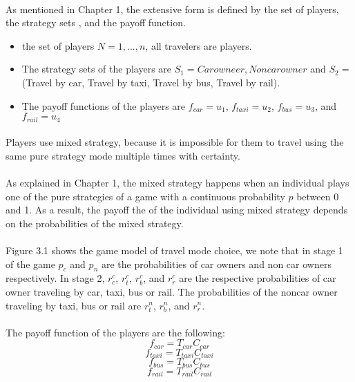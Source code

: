 \paragraph{} As mentioned in Chapter 1, the extensive form is defined by the set of players, the strategy sets , and the payoff function.
\begin{itemize}
\item the set of players $N = {1,...,n}$, all travelers are players.
\item The strategy sets of the players are $S_1 = {Car owneer, Noncar owner}$ and $ S_2 = $(Travel by car, Travel by taxi, Travel by bus, Travel by rail).
\item The payoff functions of the players are $f_{car} = u_1$, $f_{taxi} = u_2$, $f_{bus} = u_3$, and $f_{rail} = u_4$
\end{itemize}
\paragraph{}Players use mixed strategy, because it is impossible for them to travel using the same pure strategy mode multiple times with certainty.
\paragraph{}As explained in Chapter 1, the mixed strategy happens when an individual plays one of the pure strategies of a game with a continuous probability $p$ between 0 and 1. As a result, the payoff the of the individual using mixed strategy depends on the probabilities of the mixed strategy.
\paragraph{}Figure 3.1 shows the game model of travel mode choice, we note that in stage 1 of the game $p_c$ and $p_n$ are the probabilities of car owners and non car owners respectively. In stage 2, $r^c_{c}$, $r^{c}_{t}$, $r^c_{b}$, and $r^c_{r}$ are the respective probabilities of car owner traveling by car, taxi, bus or rail. The probabilities of the noncar owner traveling by taxi, bus or rail are $r^n_{t}$, $r^n_{b}$, and $r^n_{r}$.
\paragraph{}The payoff function of the players are the following: 
\begin{equation}
f_{car} = T_{car} C_{car}
\end{equation}
\begin{equation}
f_{taxi} = T_{taxi} C_{taxi}
\end{equation}
\begin{equation}
f_{bus} = T_{bus} C_{bus}
\end{equation}
\begin{equation}
f_{rail} = T_{rail} C_{rail}
\end{equation}
